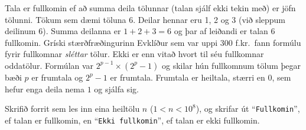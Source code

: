 \begin{problem}
	Tala er fullkomin ef að summa deila tölunnar (talan sjálf ekki tekin með) er jöfn tölunni.
	Tökum sem dæmi töluna $6$. Deilar hennar eru 1, 2 og 3 (við sleppum deilinum $6$). Summa deilanna er $1 + 2 + 3 = 6$ og þar af leiðandi er talan $6$ fullkomin.
	Gríski stærðfræðingurinn Evklíður sem var uppi 300 f.kr.\ fann formúlu fyrir fullkomnar \textit{sléttar} tölur. Ekki er enn vitað hvort til séu fullkomnar oddatölur.
	Formúlan var $2^{p - 1} \times (2^p - 1)$ og skilar hún fullkomnum tölum þegar bæði $p$ er frumtala og $2^p - 1$ er frumtala. Frumtala er heiltala, stærri en $0$, sem hefur enga deila nema $1$ og sjálfa sig.

	Skrifið forrit sem les inn eina heiltölu $n$ ($1 < n < 10^8$), og skrifar út "`\texttt{Fullkomin}"', ef talan er fullkomin, en "`\texttt{Ekki fullkomin}"', ef talan er ekki fullkomin.

\begin{example}
%
\end{example}
\begin{example}
%
\end{example}
\begin{example}
%
\end{example}
\begin{example}
%
\end{example}
\begin{example}
%
\end{example}
\end{problem}